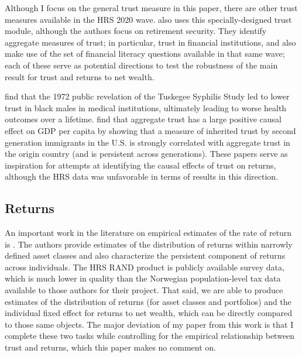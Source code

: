  Although I focus on the general trust measure in this paper, there are other trust measures available in the HRS 2020 wave. \cite{Rosen2025} also uses this specially-designed trust module, although the authors focus on retirement security. They identify aggregate measures of trust; in particular, trust in financial institutions, and also make use of the set of financial literacy questions available in that same wave; each of these serve as potential directions to test the robustness of the main result for trust and returns to net wealth. 



\par\cite{Alsan2018} find that the 1972 public revelation of the Tuskegee Syphilis Study led to  lower trust in black males in medical institutions, ultimately leading to worse health outcomes over a lifetime. \cite{Algan2010} find that aggregate trust has a large positive causal effect on GDP per capita by showing that a measure of inherited trust by second generation immigrants in the U.S. is strongly correlated with aggregate trust in the origin country (and is persistent across generations). These papers serve as inspiration for attempts at identifying the causal effects of trust on returns, although the HRS data was unfavorable in terms of results in this direction. 

 
\subsection{Returns}

\par An important work in the literature on empirical estimates of the rate of return is \cite{aflgdmlp20}. The authors provide estimates of the distribution of returns within narrowly defined asset classes and also characterize the persistent component of returns across individuals. The HRS RAND product is publicly available survey data, which is much lower in quality than the Norwegian population-level tax data available to those authors for their project. That said, we are able to produce estimates of the distribution of returns (for asset classes and portfolios) and the individual fixed effect for returns to net wealth, which can be directly compared to those same objects. The major deviation of my paper from this work is that  I complete these two tasks while controlling for the empirical relationship between trust and returns, which this paper makes no comment on. 

